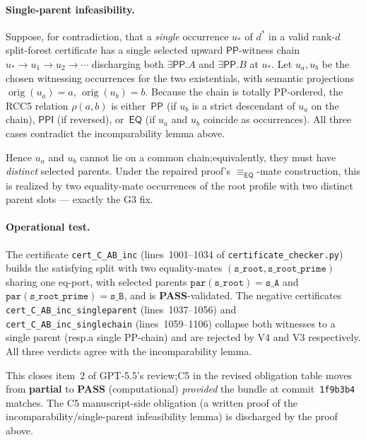 \documentclass[11pt]{article}
\newcommand{\EQ}{\mathsf{EQ}}
\newcommand{\PP}{\mathsf{PP}}
\newcommand{\PPI}{\mathsf{PPI}}
\newcommand{\eqrel}{\equiv_{\EQ}}
\newcommand{\PASS}{\textcolor{black!70!green}{\textbf{PASS}}}
\newcommand{\PARTIAL}{\textcolor{black!60!orange}{\textbf{partial}}}
\newcommand{\orig}{\operatorname{orig}}
\begin{document}
\paragraph{Single-parent infeasibility.}  Suppose, for contradiction,
that a \emph{single} occurrence \(u_*\) of \(d^*\) in a valid
rank-\(d\) split-forest certificate has a single selected upward
\(\PP\)-witness chain \(u_* \to u_1 \to u_2 \to \cdots\) discharging
both \(\exists\PP.A\) and \(\exists\PP.B\) at \(u_*\).  Let
\(u_a, u_b\) be the chosen witnessing occurrences for the two
existentials, with semantic projections \(\orig(u_a) = a\),
\(\orig(u_b) = b\).  Because the chain is totally PP-ordered, the
RCC5 relation \(\rho(a, b)\) is either~\(\PP\) (if \(u_b\) is a
strict descendant of \(u_a\) on the chain), \(\PPI\) (if reversed),
or~\(\EQ\) (if \(u_a\) and \(u_b\) coincide as occurrences).  All
three cases contradict the incomparability lemma above.

Hence \(u_a\) and \(u_b\) cannot lie on a common chain;\@ equivalently,
they must have \emph{distinct} selected parents.  Under the
repaired proof's
\(\eqrel\)-mate construction, this is realized by two
equality-mate occurrences of the root profile with two distinct
parent slots --- exactly the G3 fix.

\paragraph{Operational test.}  The certificate
\texttt{cert\_C\_AB\_inc} (lines~1001--1034 of
\texttt{certificate\_checker.py}) builds the satisfying split
with two equality-mates
\((\texttt{s\_root}, \texttt{s\_root\_prime})\) sharing one
eq-port, with selected parents
\(\texttt{par}(\texttt{s\_root}) = \texttt{s\_A}\) and
\(\texttt{par}(\texttt{s\_root\_prime}) = \texttt{s\_B}\), and is
\PASS{}-validated.  The negative certificates
\texttt{cert\_C\_AB\_inc\_singleparent} (lines~1037--1056) and
\texttt{cert\_C\_AB\_inc\_singlechain} (lines~1059--1106) collapse
both witnesses to a single parent (resp.\@ a single PP-chain) and
are rejected by V4 and V3 respectively.  All three verdicts agree
with the incomparability lemma.

This closes item~2 of GPT-5.5's review;\@ C5 in the revised
obligation table moves from \PARTIAL{} to \PASS{} (computational)
\emph{provided} the bundle at commit~\texttt{1f9b3b4} matches.
The C5 manuscript-side obligation (a written proof of the
incomparability/single-parent infeasibility lemma) is discharged
by the proof above.
\end{document}
